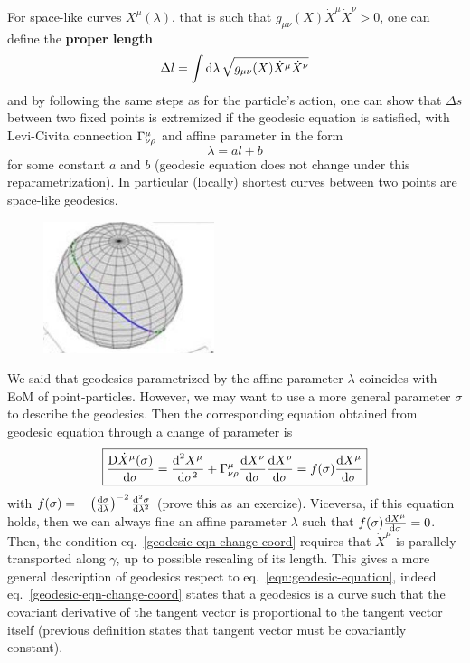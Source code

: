 \documentclass[../main/main.tex]{subfiles}
\begin{document}
For space-like curves $X^\mu(\lambda)$, that is such that $g_{\mu\nu}(X)\dot X^\mu\dot X^\nu>0$, one can define the \textbf{proper length}
\[\Delta l=\int\textup{d}\lambda\,\sqrt{g_{\mu\nu}(X)\dot X^\mu\dot X^\nu}\]
and by following the same steps as for the particle's action, one can show that $\Delta s$ between two fixed points is extremized if the geodesic equation is satisfied, with Levi-Civita connection ${\Gamma}^{\mu}_{\nu \rho}$ and affine parameter in the form 
\[\lambda=al+b\]
for some constant $a$ and $b$ (geodesic equation does not change under this reparametrization). In particular (locally) shortest curves between two points are space-like geodesics. 

\begin{figure}[H]
\centering
\includegraphics[width=5cm]{../img/extremized-geodesic.jpg}
\end{figure}

We said that geodesics parametrized by the affine parameter $\lambda$ coincides with EoM of point-particles. However, we may want to use a more general parameter $\sigma$ to describe the geodesics. Then the corresponding equation obtained from geodesic equation through a change of parameter is
\begin{equation}\label{geodesic-eqn-change-coord}\boxed{
\frac{\text{D}\dot X^\mu(\sigma)}{\textup{d}\sigma}=\frac{\textup{d}^2 X^\mu}{\textup{d}\sigma^2}+{\Gamma}^{\mu}_{\nu \rho}\frac{\textup{d} X^\nu}{\textup{d} \sigma}\frac{\textup{d} X^\rho}{\textup{d} \sigma}=f(\sigma)\frac{\textup{d} X^\mu}{\textup{d} \sigma}
}\end{equation}
with $f(\sigma)=-\left(\frac{\textup{d} \sigma}{\textup{d} \lambda}\right)^{-2}\frac{\textup{d}^2\sigma}{\textup{d}\lambda^2}$ (prove this as an exercize). Viceversa, if this equation holds, then we can always fine an affine parameter $\lambda$ such that $f(\sigma)\frac{\textup{d} X^\mu}{\textup{d} \sigma}=0$. 
Then, the condition eq.~\eqref{geodesic-eqn-change-coord} requires that $\dot X^\mu$ is parallely transported along $\gamma$, up to possible rescaling of its length. This gives a more general description of geodesics respect to eq.~\eqref{eqn:geodesic-equation}, indeed eq.~\eqref{geodesic-eqn-change-coord} states that a geodesics is a curve such that the covariant derivative of the tangent vector is proportional to the tangent vector itself (previous definition states that tangent vector must be covariantly constant). 
\end{document}
